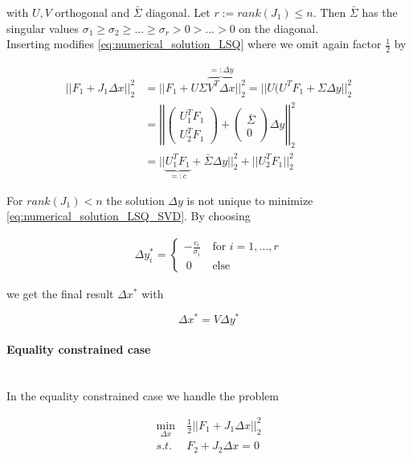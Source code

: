 \documentclass{scrartcl}[12pt, halfparskip]
\numberwithin{equation}{section}
\numberwithin{figure}{section}
\numberwithin{table}{section}
\begin{document}
\begin{itemize}
	with $U, V$ orthogonal and $\bar{\Sigma}$ diagonal. Let $r := rank(J_1) \le n$. Then $\bar{\Sigma}$ has the singular values $\sigma_1 \ge \sigma_2 \ge ... \ge \sigma_r > 0 > ... > 0$ on the diagonal. \\
	Inserting modifies \eqref{eq:numerical_solution_LSQ} where we omit again factor $\frac{1}{2}$ by
	
	\begin{align}
		|| F_1 + J_1 \Delta x ||_2^2 & = || F_1 + U \Sigma \overbrace{V^T \Delta x}^{=: \Delta y} ||_2^2 = || U ( U^T F_1 + \Sigma \Delta y ||_2^2 \label{eq:numerical_solution_LSQ_SVD} \\
		& = \left| \left| \begin{pmatrix}
		U_1^T F_1 \\
		U_2^T F_1
		\end{pmatrix} + 
		\begin{pmatrix}
		\bar{\Sigma} \\
		0
		\end{pmatrix}
		\Delta y \right| \right|_2^2 \nonumber \\
		& = || \underbrace{U_1^T F_1}_{=: c} + \bar{\Sigma} \Delta y ||_2^2 + || U_2^T F_1 ||_2^2 \nonumber
	\end{align}
	
	For $rank(J_1) < n$ the solution $\Delta y$ is not unique to minimize \eqref{eq:numerical_solution_LSQ_SVD}. By choosing
	
	\begin{align}
		\Delta y_i^* = 
		\begin{cases}
			- \frac{c_i}{\sigma_i} \ & \text{for } i=1,...,r \\
			\ 0 \ & \text{else}
		\end{cases}
	\end{align}
	
	we get the final result $\Delta x^*$ with
	
	\begin{equation}
		\Delta x^* = V \Delta y^*
	\end{equation}

\end{itemize}


\paragraph{Equality constrained case}\mbox{}\\
In the equality constrained case we handle the problem

\begin{align}
	\min_{\Delta x} & \ \frac{1}{2} || F_1 + J_1 \Delta x ||_2^2 \label{eq:numerical_soln_eq_constrained_LSQ} \\
	s.t. & \ F_2 + J_2 \Delta x = 0 \nonumber
\end{align}
\end{document}

